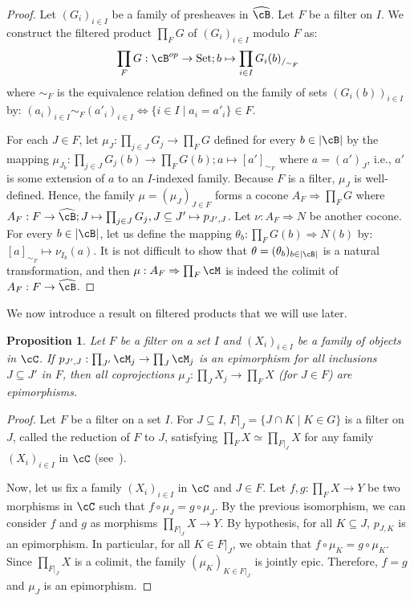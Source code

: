 \documentclass[preprint,3p,times]{elsarticle}
\newtheorem{proposition}[definition]{Proposition}
\newcommand{\Set}{\mathrm{Set}}
\newcommand{\set}[1]{\{#1\}}                                %
\begin{document}
\begin{proof}
Let $(G_i)_{i \in I}$ be a family of presheaves in $\widehat{\cB}$. Let $F$ be a filter on $I$. We construct the filtered product $\prod_F G$ of $(G_i)_{i \in I}$ modulo $F$ as: 
$$\prod_F G : \cB^{op} \to \Set; b \mapsto \prod_{i \in I} G_i(b)_{/_{\sim_F}}$$ 
where $\sim_F$ is the equivalence relation defined on the family of sets $(G_i(b))_{i \in I}$ by: $(a_i)_{i \in I} \sim_F (a'_i)_{i \in I} \Leftrightarrow \{i \in I \mid a_i = a'_i\} \in F$.

\medskip
For each $J \in F$, let $\mu_J : \prod_{j \in J} G_j \to \prod_F G$ defined for every $b \in |\cB|$ by the mapping $\mu_{J_b} : \prod_{j \in J} G_j(b) \to \prod_F G(b);a \mapsto [a']_{\sim_F}$ where $a = (a')_J$, i.e., \(a'\) is some extension of \(a\) to an \(I\)-indexed family. Because $F$ is a filter, $\mu_J$ is well-defined. Hence, the family $\mu = (\mu_J)_{J \in F}$ forms a cocone $A_F \Rightarrow \prod_F G$ where $A_F : F \to \widehat{\cB};J \mapsto \prod_{j \in J} G_j,J \subseteq J' \mapsto p_{J',J}$. Let $\nu : A_F \Rightarrow N$ be another cocone. For every $b \in |\cB|$, let us define the mapping $\theta_b : \prod_F G(b) \Rightarrow N(b)$ by: $[a]_{\sim_F} \mapsto \nu_{I_b}(a)$. 
It is not difficult to show that $\theta = (\theta_b)_{b \in |\cB|}$ is a natural transformation, and then $\mu : A_F \Rightarrow \prod_F \cM$ is indeed the colimit of $A_F : F \to \widehat{\cB}$.
\end{proof}

We now introduce a result on filtered products that we will use later.

\begin{proposition}
\label{prop: is an epimorphism}
Let $F$ be a filter on a set $I$ and $(X_i)_{i \in I}$ be a family of objects in $\cC$.
If \(p_{J',J} : \prod_{J'} \cM_j \to \prod_J \cM_j\) is an epimorphism for all inclusions \(J \subseteq J'\) in \(F\), then all coprojections \(\mu_J : \prod_J X_j \to \prod_F X\) (for \(J \in F\)) are epimorphisms.
\end{proposition}

\begin{proof}
Let \(F\) be a filter on a set \(I\).
For \(J \subseteq I\), \(F|_J = \set{J \cap K \mid K \in G}\) is a filter on \(J\), called the reduction of \(F\) to \(J\), satisfying \(\prod_F X \simeq \prod_{F|_J} X\) for any family \((X_i)_{i \in I}\) in \(\cC\) (see~\cite[Prop.~6.3]{Dia08}).

Now, let us fix a family \((X_i)_{i \in I}\) in \(\cC\) and \(J \in F\). Let \(f,g : \prod_F X \to Y\)
be two morphisms in \(\cC\) such that \(f \circ \mu_J = g \circ \mu_J\). By the previous isomorphism, we can consider \(f\) and \(g\) as morphisms \(\prod_{F|_J} X \to Y\). By hypothesis, for all \(K \subseteq J\), \(p_{J,K}\) is an epimorphism. In particular, for all \(K \in F|_J\), we obtain that \(f \circ \mu_K = g \circ \mu_K\). Since \(\prod_{F|_J} X\) is a colimit, the family \((\mu_K)_{K \in F|_J}\) is jointly epic. Therefore, \(f = g\) and \(\mu_J\) is an epimorphism.

\end{proof}
\end{document}
